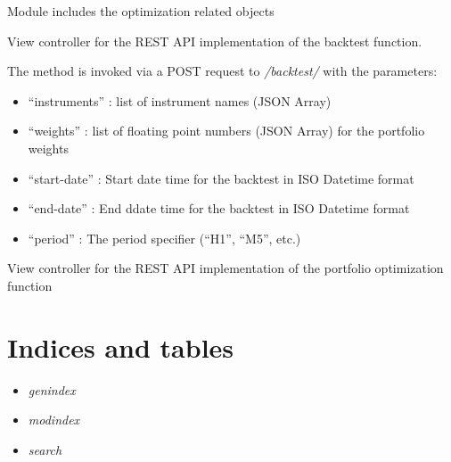 \documentclass[letterpaper,10pt,english]{sphinxmanual}
\begin{document}
\label{index:module-core.optimize}
Module includes the optimization related objects
\label{index:module-core.views}

\begin{fulllineitems}
\label{index:core.views.backtest}
View controller for the REST API implementation of the backtest function.

The method is invoked via a POST request to \emph{/backtest/} with the parameters:
\begin{itemize}
\item {} 
``instruments'' : list of instrument names (JSON Array)

\item {} 
``weights''     : list of floating point numbers (JSON Array) for the portfolio weights

\item {} 
``start-date''  : Start date time for the backtest in ISO Datetime format

\item {} 
``end-date''    : End ddate time for the backtest in ISO Datetime format

\item {} 
``period''      : The period specifier (``H1'', ``M5'', etc.)

\end{itemize}

\end{fulllineitems}


\begin{fulllineitems}
\label{index:core.views.optimize}
View controller for the REST API implementation of the portfolio optimization function

\end{fulllineitems}



\chapter{Indices and tables}
\label{index:indices-and-tables}\label{index:pom-api-documentation}\begin{itemize}
\item {} 
\emph{genindex}

\item {} 
\emph{modindex}

\item {} 
\emph{search}

\end{itemize}
\end{document}

